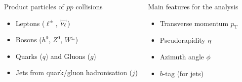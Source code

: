 \documentclass[xcolor=table,8pt]{beamer}
\begin{document}
\begin{frame}[t]
        \newcommand\brabarb{\scalebox{.3}{(}\raisebox{-1.7pt}[0pt][0pt]{$-$}\scalebox{.3}{)}}
        \vspace{-20pt}
        \begin{columns}
            \begin{center}
                \begin{block}{Product particles of \( pp \) collisions}
                    \begin{itemize}
                        \item Leptons (\( \ell^{\pm} \), \( \overset{\brabarb}{\nu_{\ell}} \)) 
                        \item Bosons (\( h^{0} \), \( Z^{0} \), \( W^{\pm} \))
                        \item Quarks (\( q \)) and Gluons (\( g \))
                        \item Jets from quark/gluon hadronisation (\( j \))
                    \end{itemize}
                \end{block}
            \end{center}
            \begin{center}
                \begin{block}{Main features for the analysis}
                    \begin{itemize}
                        \item Transverse momentum \( p_{\text{T}} \)
                        \item Pseudorapidity \( \eta \)
                        \item Azimuth angle \( \phi \)
                        \item \( b \)-tag (for jets)
                    \end{itemize}
                \end{block}
            \end{center}
        \end{columns}
    \end{frame}
\end{document}
